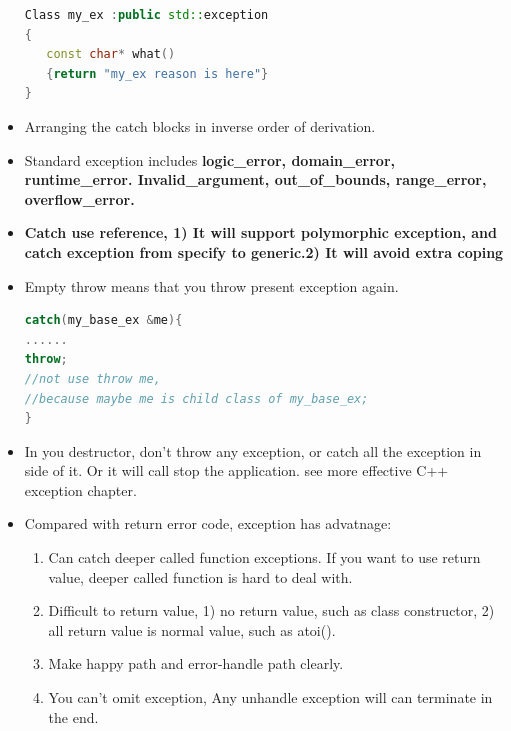 \documentclass[a4paper,12pt,twoside]{book}
\begin{document}
\begin{itemize}
\begin{lstlisting}[frame=single, language=c++]
Class my_ex :public std::exception
{
   const char* what()
   {return "my_ex reason is here"}
}
\end{lstlisting}

\item Arranging the catch blocks in inverse order of derivation.

\item Standard exception includes \textbf{logic\_error, domain\_error,  runtime\_error.  Invalid\_argument, out\_of\_bounds, range\_error, overflow\_error.}

\item \textbf{Catch use reference, 1) It will support polymorphic exception, and catch exception from specify to generic.2) It will avoid extra coping}

\item Empty throw means that you throw present exception again.
\begin{lstlisting}[frame=single, language=c++]
catch(my_base_ex &me){
......
throw;
//not use throw me,
//because maybe me is child class of my_base_ex;
}
\end{lstlisting}

\item In you destructor, don't throw any exception, or catch all the exception in side of it. Or it will call stop the application. see more effective C++ exception chapter.

\item Compared with return error code, exception has advatnage:
\begin{enumerate}
\item  Can catch deeper called function exceptions. If you want to use return value, deeper called function is hard to deal with.
\item Difficult to return value, 1) no return value, such as class constructor, 2) all return value is normal value, such as atoi().
\item Make happy path and error-handle path clearly.
\item You can't omit exception, Any unhandle exception will can terminate in the end.
\end{enumerate}

\end{itemize}
\end{document}

